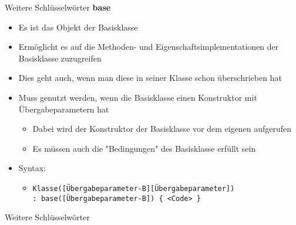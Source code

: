 \begin{frame}{Weitere Schlüsselwörter}
	\textbf{base}\\
	\begin{itemize}
		\item Es ist das Objekt der Basisklasse
		\item Ermöglicht es auf die Methoden- und Eigenschaftsimplementationen der Basisklasse zuzugreifen
		\item Dies geht auch, wenn man diese in seiner Klasse schon überschrieben hat
	\end{itemize}
	\begin{itemize}
		\item Muss genutzt werden, wenn die Basisklasse einen Konstruktor mit Übergabeparametern hat
		\begin{itemize}
			\item Dabei wird der Konstruktor der Basisklasse vor dem eigenen aufgerufen
			\item Es müssen auch die "Bedingungen" des Basisklasse erfüllt sein
		\end{itemize}
		\item Syntax:
		\begin{itemize}
			\item \texttt{\alert{Klasse}(\alert{[Übergabeparameter-B][Übergabeparameter]})\\ : base(\alert{[Übergabeparameter-B]}) \{ \alert{<Code>} \}}
		\end{itemize}
	\end{itemize}
\end{frame}

\begin{frame}{Weitere Schlüsselwörter}
	
\end{frame}

